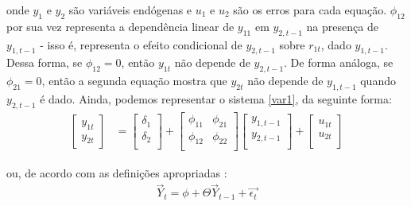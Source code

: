\noindent
onde $y_1$ e $y_2$ são variáveis endógenas e $u_1$ e $u_2$ são os erros para cada equação. $\phi_{12}$ por sua vez representa a dependência linear de $y_{11}$ em $y_{2, t-1}$ na presença de $y_{1, t-1}$ - isso é, representa o efeito condicional de $y_{2, t-1}$ sobre $r_{1t}$, dado $y_{1, t-1}$. Dessa forma, se $\phi_{12} = 0$, então $y_{1t}$ não depende de $y_{2, t-1}$. De forma análoga, se $\phi_{21}=0$, então a segunda equação mostra que $y_{2t}$ não depende de $y_{1, t-1}$ quando $y_{2, t-1}$ é dado. Ainda, podemos representar o sistema \ref{var1}, da seguinte forma:
\begin{align*}
\begin{bmatrix}
    y_{1t} \\
    y_{2t}
\end{bmatrix}
&=
\begin{bmatrix}
    \delta_1 \\
    \delta_2 \\
\end{bmatrix}
+
\begin{bmatrix}
    \phi_{11} & \phi_{21} \\
    \phi_{12} & \phi_{22} \\
\end{bmatrix}
\begin{bmatrix}
    y_{1,t-1} \\
    y_{2,t-1} \\
\end{bmatrix}
+
\begin{bmatrix}
    u_{1t} \\
    u_{2t} \\
\end{bmatrix}
\end{align*}



\noindent
ou, de acordo com as definições apropriadas \cite[p.322]{verbeek2008guide}:
\begin{align*}
    \Vec{Y}_t = \phi + \Theta \Vec{Y}_{t-1} + \Vec{\epsilon_t} 
\end{align*}

